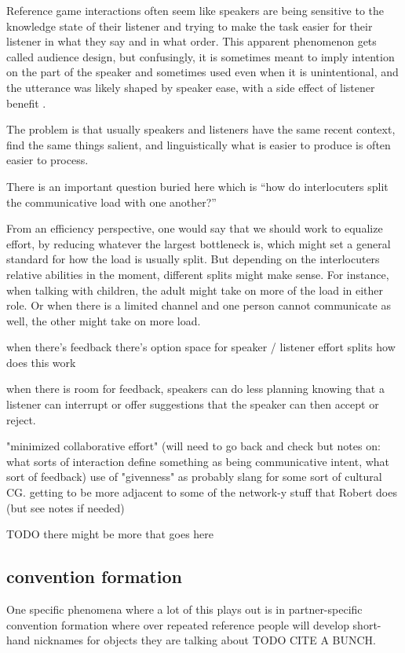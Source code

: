 \documentclass[]{article}
\begin{document}
Reference game interactions often seem like speakers are being sensitive to the knowledge state of their listener and trying to make the task easier for their listener in what they say and in what order. This apparent phenomenon gets called audience design, but confusingly, it is sometimes meant to imply intention on the part of the speaker and sometimes used even when it is unintentional, and the utterance was likely shaped by speaker ease, with a side effect of listener benefit \cite{horton1996, rogers2013}. 

The problem is that usually speakers and listeners have the same recent context, find the same things salient, and linguistically what is easier to produce is often easier to process. 

There is an important question buried here which is ``how do interlocuters split the communicative load with one another?''

From an efficiency perspective, one would say that we should work to equalize effort, by reducing whatever the largest bottleneck is, which might set a general standard for how the load is usually split. But depending on the interlocuters relative abilities in the moment, different splits might make sense. For instance, when talking with children, the adult might take on more of the load in either role. Or when there is a limited channel and one person cannot communicate as well, the other might take on more load. 

\cite{yoon2019} when there's feedback there's option space for speaker / listener effort splits how does this work 

\cite{clark1986} when there is room for feedback, speakers can do less planning knowing that a listener can interrupt or offer suggestions that the speaker can then accept or reject. 

\cite{fay2010} "minimized collaborative effort" (will need to go back and check but notes on: what sorts of interaction define something as being communicative intent, what sort of feedback) use of "givenness" as probably slang for some sort of cultural CG. getting to be more adjacent to some of the network-y stuff that Robert does (but see notes if needed) 


TODO there might be more that goes here 

\subsection{convention formation}
One specific phenomena where a lot of this plays out is in partner-specific convention formation where over repeated reference people will develop short-hand nicknames for objects they are talking about TODO CITE A BUNCH. 
\end{document}

